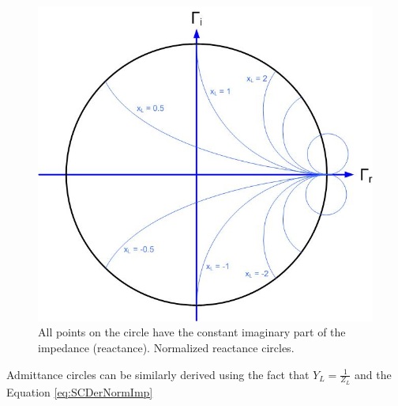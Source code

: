 \documentclass{ximera}
\begin{document}
\begin{figure}[htbp]
\begin{center}
\includegraphics[scale=0.3]{../jpg/smithchartimaginary.jpg}
\end{center}
\caption{All points on the circle have the constant imaginary part of the impedance (reactance). Normalized reactance circles.}
\label{fig:SCDerscreactance}
\end{figure}

Admittance circles can be similarly derived using the fact that $Y_L=\frac{1}{Z_L}$ and the Equation \ref{eq:SCDerNormImp}
\end{document}
